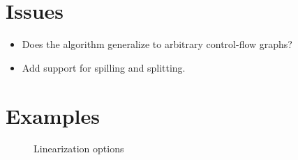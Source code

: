 \documentclass[12pt]{article}
\begin{document}
\pagebreak

\section{Issues}

\begin{itemize}
  \item Does the algorithm generalize to arbitrary control-flow graphs?
  \item Add support for spilling and splitting.
\end{itemize}

\section{Examples}

\begin{figure}[h!]
  \centering
   \hfill
  \caption{Linearization options}
  \label{fig:linearization-options}
\end{figure}
\end{document}
